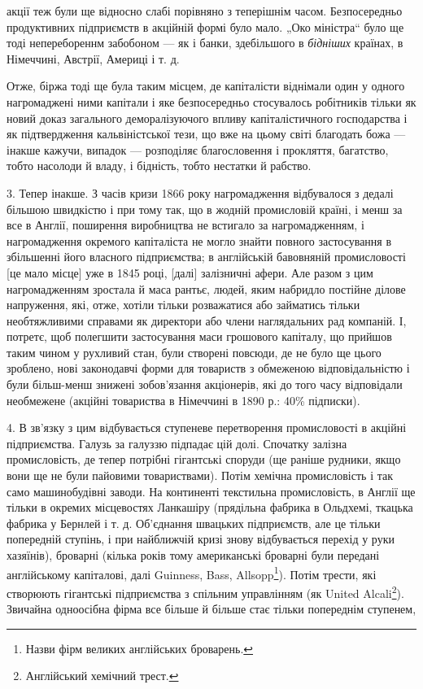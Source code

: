 \parcont{}  %
акції теж були ще відносно слабі порівняно з теперішнім часом. Безпосередньо продуктивних підприємств в акційній формі було
мало. „Око міністра“ було ще тоді неперебореннм забобоном — як і банки, здебільшого в \emph{бідніших} країнах, в Німеччині,
Австрії, Америці і т. д.

Отже, біржа тоді ще була таким місцем, де капіталісти віднімали один у одного нагромаджені ними
капітали і яке безпосередньо стосувалось робітників тільки як новий доказ загального деморалізуючого впливу капіталістичного
господарства і як підтвердження кальвіністської тези, що вже на цьому світі благодать божа — інакше кажучи, випадок —
розподіляє благословення і прокляття, багатство, тобто насолоди й владу, і бідність, тобто нестатки й рабство.

3. Тепер інакше. З часів кризи 1866 року нагромадження відбувалося з дедалі більшою швидкістю і при тому так, що в жодній промисловій
країні, і менш за все в Англії, поширення виробництва не встигало за нагромадженням, і нагромадження окремого капіталіста не
могло знайти повного застосування в збільшенні його власного підприємства; в англійській бавовняній промисловості [це мало
місце] уже в 1845 році, [далі] залізничні афери. Але разом з цим нагромадженням зростала й маса рантьє, людей, яким набридло
постійне ділове напруження, які, отже, хотіли тільки розважатися або займатись тільки необтяжливими справами як директори
або члени наглядальних рад компаній. І, потретє, щоб полегшити застосування маси грошового капіталу, що прийшов таким чином
у рухливий стан, були створені повсюди, де не було ще цього зроблено, нові законодавчі форми для товариств з обмеженою
відповідальністю і були більш-менш знижені зобов’язання акціонерів, які до того часу відповідали необмежене (акційні
товариства в Німеччині в 1890 р.: 40\% підписки).

4. В зв’язку з цим відбувається ступеневе перетворення промисловості в акційні підприємства. Галузь за галуззю підпадає цій
долі. Спочатку залізна промисловість, де тепер потрібні гігантські споруди (ще раніше рудники, якщо вони ще не були пайовими
товариствами). Потім хемічна промисловість і так само машинобудівні заводи. На континенті текстильна промисловість, в Англії
ще тільки в окремих місцевостях Ланкашіру (прядільна фабрика в Ольдхемі, ткацька фабрика у Бернлей і т. д. Об’єднання
швацьких підприємств, але це тільки попередній ступінь, і при найближчій кризі знову відбувається перехід у руки хазяїнів),
броварні (кілька років тому американські броварні були передані англійському капіталові, далі Guinness, Bass,  Allsopp\footnote*{Назви фірм великих англійських броварень. }).
Потім трести, які створюють гігантські підприємства з спільним управлінням (як United Alcali\footnote*{Англійський хемічний трест. }). Звичайна одноосібна фірма
все більше й більше стає тільки попереднім ступенем,
\parbreak{}  %
